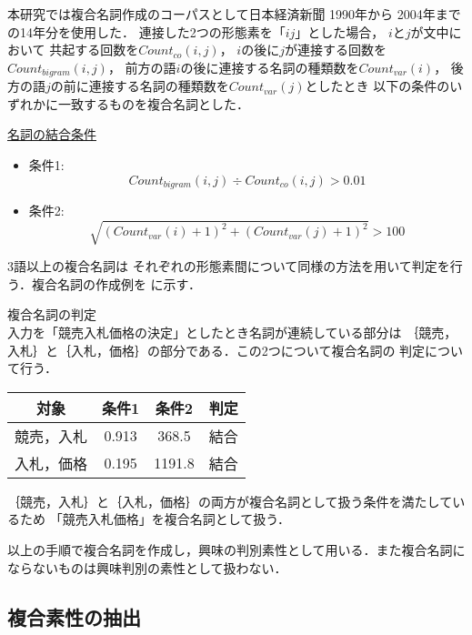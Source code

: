\documentclass[japanese]{jnlp_1.4}
\newcounter{ex}
\def\ex#1{}
\def\exref#1{}
\begin{document}
本研究では複合名詞作成のコーパスとして日本経済新聞
1990年から
2004年までの14年分を使用した．
 連接した2つの形態素を「$i j$」とした場合，
$i$と$j$が文中において
共起する回数を$Count_{co}(i,j)$， 
$i$の後に$j$が連接する回数を$Count_{bigram}(i,j)$，
前方の語$i$の後に連接する名詞の種類数を$Count_{var}(i)$，
後方の語$j$の前に連接する名詞の種類数を$Count_{var}(j)$としたとき
以下の条件のいずれかに一致するものを複合名詞とした．

\underline{名詞の結合条件}
\begin{itemize}
\item 条件1:
      \begin{equation}
       Count_{bigram}(i,j) \div {Count_{co}(i,j)} > 0.01
      \end{equation}
\item 条件2:
      \begin{equation}
       \sqrt{(Count_{var}(i)+1)^2+(Count_{var}(j)+1)^2} > 100
      \end{equation}
\end{itemize}

3語以上の複合名詞は
それぞれの形態素間について同様の方法を用いて判定を行う．複合名詞の作成例を
\exref{fukuex}に示す．

\begin{itembox}{\ex{}\label{fukuex}複合名詞の判定\\}
入力を「競売入札価格の決定」としたとき名詞が連続している部分は
｛競売，入札｝と｛入札，価格｝の部分である．この2つについて複合名詞の
判定について行う．
\vspace{0.5zw}
\begin{center}
\begin{tabular}{c|c|c|c}\hline
対象&条件1&条件2&判定\\ \hline
競売，入札&0.913&368.5&結合\\ \hline
入札，価格 &0.195&1191.8&結合\\ \hline
\end{tabular}
\end{center}
\vspace{0.5zw}
｛競売，入札｝と｛入札，価格｝の両方が複合名詞として扱う条件を満たしているため
「競売入札価格」を複合名詞として扱う．
\end{itembox}
以上の手順で複合名詞を作成し，興味の判別素性として用いる．また複合名詞に
ならないものは興味判別の素性として扱わない．

\subsection{複合素性の抽出}\label{taple}
\end{document}
